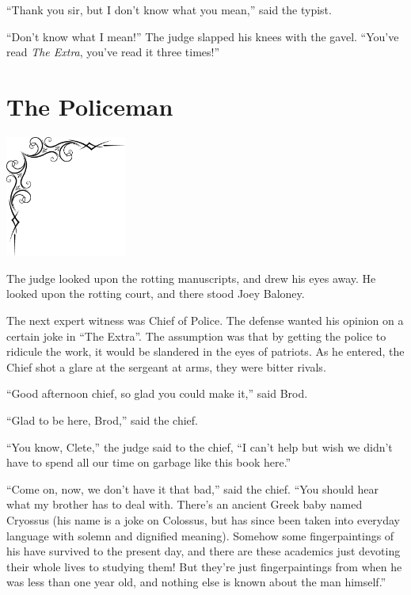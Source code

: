 \documentclass[oneside]{book}
\begin{document}
``Thank you sir, but I don't know what you mean,'' said the typist.

``Don't know what I mean!''  The judge slapped his knees with the gavel.  ``You've read \emph{The Extra},
you've read it three times!''


\chapter{The Policeman}

\vspace{-2in}
\hspace{-.5in}
\includegraphics[width=150px]{ulcorner1.eps}

The judge looked upon the rotting manuscripts, and drew his eyes away.
He looked upon the rotting court, and there stood Joey Baloney.

The next expert witness was Chief of Police.  The defense wanted his opinion on a certain
joke in ``The Extra''.  The assumption was that by getting the police to ridicule the work,
it would be slandered in the eyes of patriots.  As he entered, the Chief
shot a glare at the sergeant at arms, they were bitter rivals.

``Good afternoon chief, so glad you could make it,'' said Brod.

``Glad to be here, Brod,'' said the chief.

``You know, Clete,'' the judge said to the chief,
``I can't help but wish we didn't have to spend
all our time on garbage like this book here.''

``Come on, now, we don't have it that bad,'' said the chief.
``You should hear what my brother has to deal with.
There's an ancient Greek baby named Cryossus (his name is a joke
on Colossus, but has since been taken into everyday language with
solemn and dignified meaning).  Somehow some fingerpaintings of his
have survived to the present day, and there are these academics
just devoting their whole lives to studying them!  But they're just
fingerpaintings from when he was less than one year old, and
nothing else is known about the man himself.''
\end{document}
